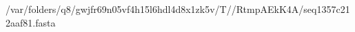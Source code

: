 \documentclass[10pt]{article}
\begin{document}
\begin{texshade}{/var/folders/q8/gwjfr69n05vf4h15l6hdl4d8x1zk5v/T//RtmpAEkK4A/seq1357c212aaf81.fasta}
\hidelogoscale
{}
\showlegend
\end{texshade}
\end{document}
